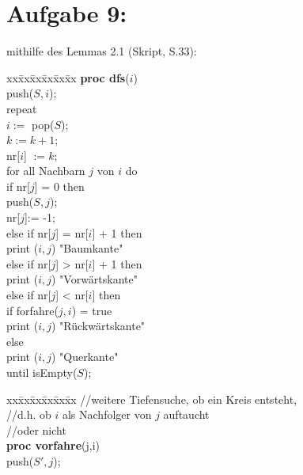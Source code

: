 \documentclass[11pt]{scrartcl} %
\begin{document}
\section*{Aufgabe 9:}
\begin{compactenum}[(a)]
	\item mithilfe des Lemmas 2.1 (Skript, S.33):\\
	\begin{minipage}[t]{0.5em}
		\begin{tabbing}
		xx\= xx\= xx\= xx\= xx\= xx \kill
		\textbf{proc dfs}($i$)\\
		\> push($S,i$);\\
		\> repeat\\
		\>\> $i:=$ pop($S$);\\
		\>\> $k:=k+1$;\\
		\>\> nr[$i$] $:=k$;\\
		\>\> for all Nachbarn $j$ von $i$ do\\
		\>\>\> if nr[$j$] = 0 then\\
		\>\>\>\> push($S,j$);\\
		\>\>\>\> nr[$j$]:= -1;\\
		\>\>\> else if nr[$j$] = nr[$i$] + 1 then\\
		\>\>\>\> print ($i,j$)  "Baumkante"\\
		\>\>\> else if nr[$j$] > nr[$i$] + 1 then\\
		\>\>\>\> print ($i,j$) "Vorwärtskante"\\
		\>\>\> else if nr[$j$] < nr[$i$] then\\
		\>\>\>\> if forfahre($j,i$) = true\\
		\>\>\>\>\> print ($i,j$) "Rückwärtskante"\\
		\>\>\>\> else\\
		\>\>\>\>\> print ($i,j$) "Querkante"\\
		\> until isEmpty($S$);\\[0.5em]
		\end{tabbing}
	\end{minipage}
	\begin{minipage}[t]{0.5em}
		\begin{tabbing}
		xx\= xx\= xx\= xx\= xx\= xx \kill
		//weitere Tiefensuche, ob ein Kreis entsteht, \\
		//d.h. ob $i$ als Nachfolger von $j$ auftaucht \\
		//oder nicht\\
		\textbf{proc vorfahre}(j,i)\\
		\> push($S',j$);\\

\end{tabbing}
\end{minipage}
\end{compactenum}
\end{document}
